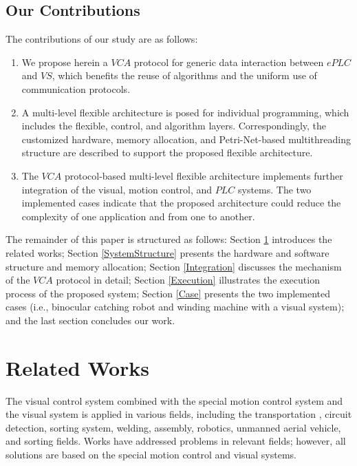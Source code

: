 \documentclass[journal,UTF8]{IEEEtran}
\begin{document}
	\subsection{Our Contributions}
	The contributions of our study are as follows:
	\begin{enumerate}
		\item We propose herein a $VCA$ protocol for generic data interaction between $ePLC$ and $VS$, which benefits the reuse of algorithms and the uniform use of communication protocols.
		\item A multi-level flexible architecture is posed for individual programming, which includes the flexible, control, and algorithm layers. Correspondingly, the customized hardware, memory allocation, and Petri-Net-based multithreading structure are described to support the proposed flexible architecture.
		\item The $VCA$ protocol-based multi-level flexible architecture implements further integration of the visual, motion control, and $PLC$ systems. The two implemented cases indicate that the proposed architecture could reduce the complexity of one application and from one to another.  
	\end{enumerate}
	
	The remainder of this paper is structured as follows: Section \ref{RW} introduces the related works; Section \ref{SystemStructure} presents the hardware and software structure and memory allocation; Section \ref{Integration} discusses the mechanism of the $VCA$ protocol in detail; Section \ref{Execution} illustrates the execution process of the proposed system; Section \ref{Case} presents the two implemented cases (i.e., binocular catching robot and winding machine with a visual system); and the last section concludes our work.
	
	\section{Related Works}
	\label{RW}
	The visual control system combined with the special motion control system and the visual system is applied in various fields, including the transportation \cite{Xing2014Intersection}, circuit detection\cite{Nian2005An}, sorting system, welding\cite{Chen2014A}, assembly\cite{Xiao2014Visual}, robotics\cite{Wu2013Cloud,Tsai2017A}, unmanned aerial vehicle\cite{Serra2016Landing}, and sorting\cite{Sun2013Automatic} fields. Works have addressed problems in relevant fields; however, all solutions are based on the special motion control and visual systems.
	
\end{document}
